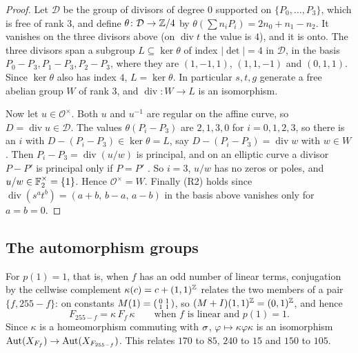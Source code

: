\begin{proof}
Let $\mathcal D$ be the group of divisors of degree $0$ supported on $\{P_0,\dots,P_3\}$, which is free of rank $3$, and define $\theta\colon\mathcal D\to\mathbb{Z}/4$ by $\theta(\sum n_iP_i)=2n_0+n_1-n_2$. It vanishes on the three divisors above (on $\operatorname{div}t$ the value is $4$), and it is onto. The three divisors span a subgroup $L\subseteq\ker\theta$ of index $|\det|=4$ in $\mathcal D$, in the basis $P_0-P_3,P_1-P_3,P_2-P_3$, where they are $(1,-1,1)$, $(1,1,-1)$ and $(0,1,1)$. Since $\ker\theta$ also has index $4$, $L=\ker\theta$. In particular $s,t,g$ generate a free abelian group $W$ of rank $3$, and $\operatorname{div}\colon W\to L$ is an isomorphism.

Now let $u\in\mathcal O^{\times}$. Both $u$ and $u^{-1}$ are regular on the affine curve, so $D=\operatorname{div}u\in\mathcal D$. The values $\theta(P_i-P_3)$ are $2,1,3,0$ for $i=0,1,2,3$, so there is an $i$ with $D-(P_i-P_3)\in\ker\theta=L$, say $D-(P_i-P_3)=\operatorname{div}w$ with $w\in W$. Then $P_i-P_3=\operatorname{div}(u/w)$ is principal, and on an elliptic curve a divisor $P-P'$ is principal only if $P=P'$ \cite[Lemma~III.3.3]{Silverman2009}. So $i=3$, $u/w$ has no zeros or poles, and $u/w\in\mathbb{F}_2^{\times}=\{1\}$. Hence $\mathcal O^{\times}=W$. Finally (R2) holds since $\operatorname{div}(s^at^b)=(a+b,\,b-a,\,a-b)$ in the basis above vanishes only for $a=b=0$.
\end{proof}

\subsection{The automorphism groups}\label{aff:sec:groups}

For $p(1)=1$, that is, when $f$ has an odd number of linear terms, conjugation by the cellwise complement $\kappa(c)=c+(1,1)^{\mathbb{Z}}$ relates the two members of a pair $\{f,255-f\}$: on constants $M(1)=\begin{psmallmatrix}0&1\\1&1\end{psmallmatrix}$, so $(M+I)(1,1)^{\mathbb{Z}}=(0,1)^{\mathbb{Z}}$, and hence
\begin{equation}\label{aff:eq:kappa}
F_{255-f}=\kappa\,F_f\,\kappa\qquad\text{when }f\text{ is linear and }p(1)=1 .
\end{equation}
Since $\kappa$ is a homeomorphism commuting with $\sigma$, $\varphi\mapsto \kappa\varphi\kappa$ is an isomorphism $\operatorname{Aut}(X_{F_f})\to\operatorname{Aut}(X_{F_{255-f}})$. This relates $170$ to $85$, $240$ to $15$ and $150$ to $105$.

